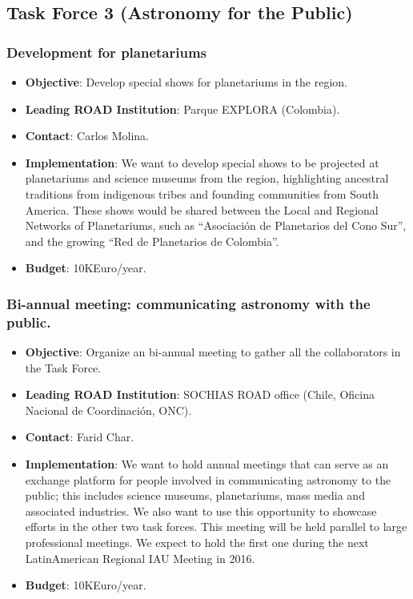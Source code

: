 \documentclass[12pt]{article}
\begin{document}
\subsection{Task Force 3 (Astronomy for the Public)}


\subsubsection{Development for planetariums}
\begin{itemize}
\item {\bf Objective}: Develop special shows for planetariums in the
  region. 
\item {\bf Leading ROAD Institution}: Parque EXPLORA (Colombia).
\item {\bf Contact}: Carlos Molina.
\item {\bf Implementation}: We want to develop special shows to be projected
  at planetariums and science museums from the region, highlighting
  ancestral traditions from indigenous tribes and founding communities
  from South America. These shows would be shared between the Local
  and Regional Networks of Planetariums, such as “Asociación de
  Planetarios del Cono Sur”, and the growing “Red de Planetarios de
  Colombia”.   
\item {\bf Budget}: 10KEuro/year.
\end{itemize}


\subsubsection{Bi-annual meeting: communicating astronomy with the
  public.}
\begin{itemize}
\item {\bf Objective}: Organize an bi-annual meeting to gather all the
  collaborators in the Task Force.
\item {\bf Leading ROAD Institution}: SOCHIAS ROAD office (Chile, Oficina
  Nacional de Coordinaci\'on, ONC).
\item {\bf Contact}: Farid Char.
\item {\bf Implementation}: We want to hold annual meetings that can
  serve as an exchange platform for people involved in communicating
  astronomy to the public; this includes science museums,
  planetariums, mass media and associated industries. We also want to use
  this opportunity to showcase efforts in the other two task
  forces. This meeting will be held parallel to large professional
  meetings. We expect to hold the first one during the next LatinAmerican
  Regional IAU Meeting in 2016. 
\item {\bf Budget}: 10KEuro/year.
\end{itemize}
\end{document}
